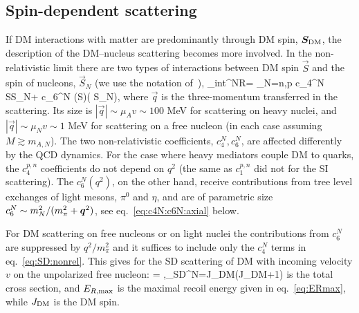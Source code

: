 \subsection{Spin-dependent scattering}
\label{sec:SD}
If DM interactions with matter are predominantly through DM spin, $\vec S_{\rm DM}$, the description of the DM--nucleus scattering becomes more involved. In the non-relativistic limit there are  two types of interactions between DM spin $\vec S$ and the spin of nucleons, $\vec S_N$  (we use the notation of~\cite{Anand:2013yka,Bishara:2017pfq}), 
\beq
\label{eq:SD:nonrel}
\Lag_{\rm int}^{\rm NR}= \sum_{N=n,p} c_4^N \vec S\cdot \vec S_N+ c_6^N \Big(\vec S\cdot {}\Big)\Big( \vec S_N\cdot {}\Big),
\eeq
where $\vec q$ is the three-momentum transferred in the scattering.  Its size is $|\vec q|\sim \mu_A v\sim 100$ MeV for scattering on heavy nuclei, and $|\vec q|\sim \mu_N v\sim 1$ MeV for scattering on a free nucleon (in each case assuming $M \gtrsim m_{A,N}$).  The two non-relativistic coefficients, $c_4^N, c_6^N$, are affected differently by the QCD dynamics. 
For the case where heavy mediators couple DM to quarks, the $c_4^{p,n}$ coefficients do not depend on $q^2$  (the same as $c_1^{p,n}$ did not for the SI scattering). The $c_6^N(q^2)$, on the other hand, receive contributions from tree level exchanges of light mesons, $\pi^0$ and $\eta$, and are of parametric size $c_6^N\sim m_N^2/(m_\pi^2+\mb{q}^2)$, see eq.~\eqref{eq:c4N:c6N:axial} below. 

For DM scattering on free nucleons or on light nuclei the contributions from $c_6^N$ are suppressed by ${q}^2/m_\pi^2$ and it suffices to include only the $c_4^N$ terms in eq.~\eqref{eq:SD:nonrel}. This gives for the SD scattering of DM with incoming velocity $v$ on the unpolarized free nucleon:
\beq
\label{eq:SD:N}
= ,\qquad {}\qquad \sigma_{\rm SD}^N=J_{\rm DM}(J_{\rm DM}+1) 
\eeq
is the total cross section, and $E_{R, {\rm max}}$ is the maximal recoil energy given in eq.~\eqref{eq:ERmax}, while $J_{\rm DM}$ is the DM spin. 

